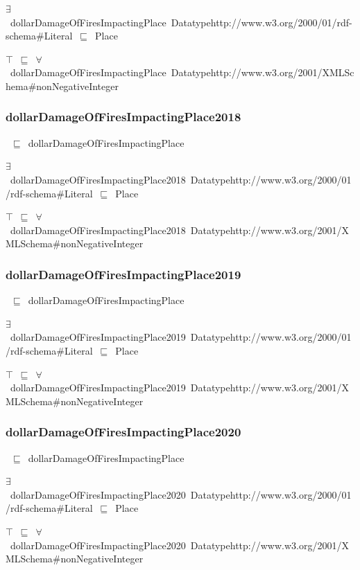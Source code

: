 \documentclass{article}
\begin{document}
\ensuremath{\exists}~dollarDamageOfFiresImpactingPlace~Datatypehttp://www.w3.org/2000/01/rdf-schema#Literal~\ensuremath{\sqsubseteq}~Place

\ensuremath{\top}~\ensuremath{\sqsubseteq}~\ensuremath{\forall}~dollarDamageOfFiresImpactingPlace~Datatypehttp://www.w3.org/2001/XMLSchema#nonNegativeInteger

\subsubsection*{dollarDamageOfFiresImpactingPlace2018}

~\ensuremath{\sqsubseteq}~dollarDamageOfFiresImpactingPlace

\ensuremath{\exists}~dollarDamageOfFiresImpactingPlace2018~Datatypehttp://www.w3.org/2000/01/rdf-schema#Literal~\ensuremath{\sqsubseteq}~Place

\ensuremath{\top}~\ensuremath{\sqsubseteq}~\ensuremath{\forall}~dollarDamageOfFiresImpactingPlace2018~Datatypehttp://www.w3.org/2001/XMLSchema#nonNegativeInteger

\subsubsection*{dollarDamageOfFiresImpactingPlace2019}

~\ensuremath{\sqsubseteq}~dollarDamageOfFiresImpactingPlace

\ensuremath{\exists}~dollarDamageOfFiresImpactingPlace2019~Datatypehttp://www.w3.org/2000/01/rdf-schema#Literal~\ensuremath{\sqsubseteq}~Place

\ensuremath{\top}~\ensuremath{\sqsubseteq}~\ensuremath{\forall}~dollarDamageOfFiresImpactingPlace2019~Datatypehttp://www.w3.org/2001/XMLSchema#nonNegativeInteger

\subsubsection*{dollarDamageOfFiresImpactingPlace2020}

~\ensuremath{\sqsubseteq}~dollarDamageOfFiresImpactingPlace

\ensuremath{\exists}~dollarDamageOfFiresImpactingPlace2020~Datatypehttp://www.w3.org/2000/01/rdf-schema#Literal~\ensuremath{\sqsubseteq}~Place

\ensuremath{\top}~\ensuremath{\sqsubseteq}~\ensuremath{\forall}~dollarDamageOfFiresImpactingPlace2020~Datatypehttp://www.w3.org/2001/XMLSchema#nonNegativeInteger
\end{document}
